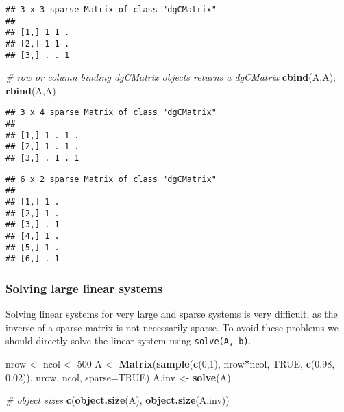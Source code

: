 \documentclass[]{article}
\newenvironment{Shaded}{\begin{snugshade}}{\end{snugshade}}
\newcommand{\CommentTok}[1]{\textcolor[rgb]{0.56,0.35,0.01}{\textit{#1}}}
\newcommand{\DataTypeTok}[1]{\textcolor[rgb]{0.13,0.29,0.53}{#1}}
\newcommand{\DecValTok}[1]{\textcolor[rgb]{0.00,0.00,0.81}{#1}}
\newcommand{\FloatTok}[1]{\textcolor[rgb]{0.00,0.00,0.81}{#1}}
\newcommand{\KeywordTok}[1]{\textcolor[rgb]{0.13,0.29,0.53}{\textbf{#1}}}
\newcommand{\NormalTok}[1]{#1}
\newcommand{\OperatorTok}[1]{\textcolor[rgb]{0.81,0.36,0.00}{\textbf{#1}}}
\newcommand{\OtherTok}[1]{\textcolor[rgb]{0.56,0.35,0.01}{#1}}
\newcommand{\StringTok}[1]{\textcolor[rgb]{0.31,0.60,0.02}{#1}}
\begin{document}
\begin{Shaded}
\end{Shaded}

\begin{verbatim}
## 3 x 3 sparse Matrix of class "dgCMatrix"
##           
## [1,] 1 1 .
## [2,] 1 1 .
## [3,] . . 1
\end{verbatim}

\begin{Shaded}
\begin{Highlighting}[]
\CommentTok{# row or column binding dgCMatrix objects returns a dgCMatrix}
\KeywordTok{cbind}\NormalTok{(A,A); }\KeywordTok{rbind}\NormalTok{(A,A)}
\end{Highlighting}
\end{Shaded}

\begin{verbatim}
## 3 x 4 sparse Matrix of class "dgCMatrix"
##             
## [1,] 1 . 1 .
## [2,] 1 . 1 .
## [3,] . 1 . 1
\end{verbatim}

\begin{verbatim}
## 6 x 2 sparse Matrix of class "dgCMatrix"
##         
## [1,] 1 .
## [2,] 1 .
## [3,] . 1
## [4,] 1 .
## [5,] 1 .
## [6,] . 1
\end{verbatim}

\hypertarget{solving-large-linear-systems}{%
\subsubsection{Solving large linear
systems}\label{solving-large-linear-systems}}

Solving linear systems for very large and sparse systems is very
difficult, as the inverse of a sparse matrix is not necessarily sparse.
To avoid these problems we should directly solve the linear system using
\texttt{solve(A,\ b)}.

\begin{Shaded}
\begin{Highlighting}[]
\NormalTok{nrow <-}\StringTok{ }\NormalTok{ncol <-}\StringTok{ }\DecValTok{500}
\NormalTok{A <-}\StringTok{ }\KeywordTok{Matrix}\NormalTok{(}\KeywordTok{sample}\NormalTok{(}\KeywordTok{c}\NormalTok{(}\DecValTok{0}\NormalTok{,}\DecValTok{1}\NormalTok{), nrow}\OperatorTok{*}\NormalTok{ncol, }\OtherTok{TRUE}\NormalTok{, }\KeywordTok{c}\NormalTok{(}\FloatTok{0.98}\NormalTok{, }\FloatTok{0.02}\NormalTok{)), nrow, ncol, }\DataTypeTok{sparse=}\OtherTok{TRUE}\NormalTok{)}
\NormalTok{A.inv <-}\StringTok{ }\KeywordTok{solve}\NormalTok{(A)}

\CommentTok{# object sizes}
\KeywordTok{c}\NormalTok{(}\KeywordTok{object.size}\NormalTok{(A), }\KeywordTok{object.size}\NormalTok{(A.inv))}
\end{Highlighting}
\end{Shaded}
\end{document}
